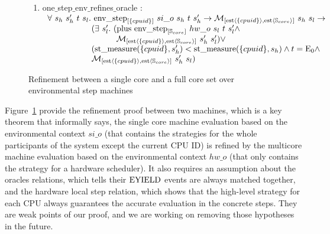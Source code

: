 \begin{figure}
\begin{enumerate}
\item one$\_$step$\_$env$\_$refines$\_$oracle : \\
$
\begin{array}{l}
\forall \ s_h \ s_h' \ t \ s_l. \ \envstep{\set{cpuid}}{si\_o}{s_h}{t}{s_h'} \rightarrow  \matchestateestate{\set{cpuid}}{s_h}{s_l} \rightarrow \\
\ \ \ \ \ \ \ \ \ \ \ \ \ \ \ \ (\exists \ s_l' .\ (\ccplusstep{\envstep{\coreset}{hw\_o}{s_l}{t}{s_l'}} \wedge\\
\ \ \ \ \ \ \ \ \ \ \ \ \ \ \ \ \ \ \ \ \ \ \ \ \  \matchestateestate{\set{cpuid}}{s_h'}{s_l'}) \vee \\ 
\ \ \ \ \ \ \ \ \ \ \ \ \ \ \ \ (\mcstatemeasurenoeq{\set{cpuid}}{s_h'} < \mcstatemeasurenoeq{\set{cpuid}}{s_h} \wedge t = \ccemptytrace \wedge \\ 
\ \ \ \ \ \ \ \ \ \ \ \ \ \ \ \ \matchestateestate{\set{cpuid}}{s_h'}{s_l})\\
\end{array}
$
\end{enumerate}
\caption{Refinement between a single core and a full core set over environmental step machines}
\label{fig:chapter:conlink:cpu-env-to-env-theorem}
\end{figure}



Figure~\ref{fig:chapter:conlink:cpu-env-to-env-theorem} provide the 
refinement proof between two machines, 
which is a key theorem that informally says, the single core machine evaluation based on the environmental context $si\_o$ (that contains 
the strategies for the whole participants of the system except the current CPU ID)
is refined
by the multicore machine evaluation based on the environmental context $hw\_o$ (that only contains the strategy for a hardware scheduler).
It also requires an assumption about the oracles relations, which tells their ${\mathrm{EYIELD}}$ events
are always matched together, 
and the hardware local step relation, which shows that the high-level strategy for each CPU always guarantees
the accurate evaluation in the concrete steps. 
They are weak points of our proof, and we are working on 
removing those hypotheses in the future.

